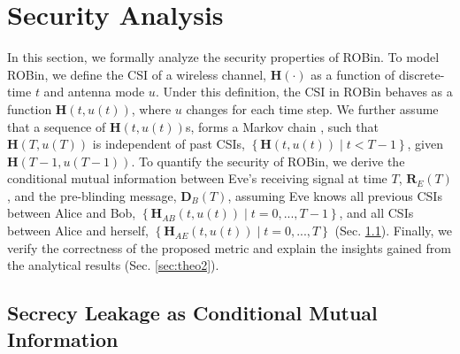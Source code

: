 \section{Security Analysis}\label{sec:theory}
In this section, we formally analyze the security properties of ROBin. To model ROBin, we define the CSI of a wireless channel, $\mathbf{H}(\cdot)$ as a function of discrete-time $t$ and antenna mode $u$. Under this definition, the CSI in ROBin behaves as a function $\mathbf{H}\left(t,u(t)\right)$, where $u$ changes for each time step. We further assume that a sequence of $\mathbf{H}\left(t, u(t)\right)$s, forms a Markov chain \cite{tan2000first}, such that $\mathbf{H}\left(T, u(T)\right)$ is independent of past CSIs, $\left\{\mathbf{H}\left(t, u(t)\right)\mid t < T-1 \right\}$, given $\mathbf{H}\left(T{-}1, u(T{-}1)\right)$. To quantify the security of ROBin, we derive the conditional mutual information between Eve's receiving signal at time $T$, $\mathbf{R}_E(T)$, and the pre-blinding message, $\mathbf{D}_B(T)$, assuming Eve knows all previous CSIs between Alice and Bob, $\left\{\mathbf{H}_{AB}\left(t,u(t)\right)\mid t = 0,...,T{-}1\right\}$, and all CSIs between Alice and herself, $\left\{\mathbf{H}_{AE}\left(t,u(t)\right)\mid t = 0,...,T\right\}$ (Sec. \ref{sec:theo1}). Finally, we verify the correctness of the proposed metric and explain the insights gained from the analytical results (Sec. \ref{sec:theo2}).

\subsection{Secrecy Leakage as Conditional Mutual Information}
\label{sec:theo1}



